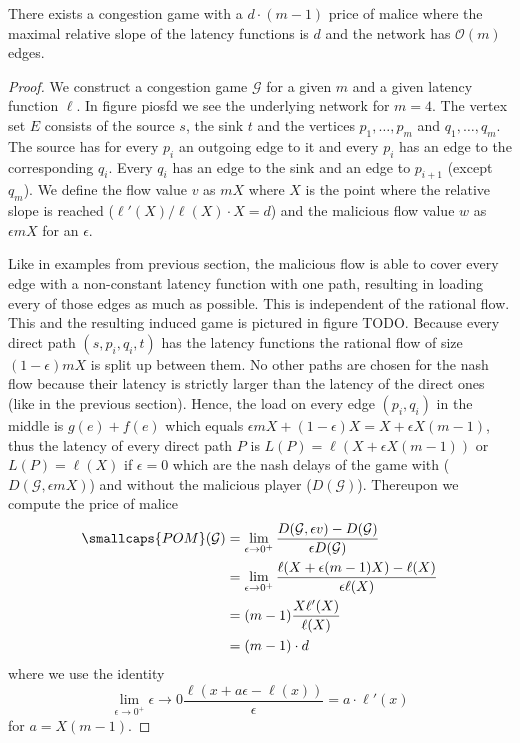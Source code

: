 \begin{theorem}
	There exists a congestion game with a $d \cdot (m - 1)$ price of malice where the maximal relative slope of the latency functions is $d$ and the network has $\mathcal O(m)$ edges.
\end{theorem}
\begin{proof}
	We construct a congestion game $\mathcal G$ for a given $m$ and a given latency function $\ell$.
	In figure piosfd we see the underlying network for $m=4$.
	The vertex set $E$ consists of the source $s$, the sink $t$ and the vertices $p_1, \dots, p_m$ and $q_1, \dots, q_m$.
	The source has for every $p_i$ an outgoing edge to it and every $p_i$ has an edge to the corresponding $q_i$.
	Every $q_i$ has an edge to the sink and an edge to $p_{i+1}$ (except $q_m$).
	We define the flow value $v$ as $mX$ where $X$ is the point where the relative slope is reached ($\ell'(X)/\ell(X) \cdot X = d$) and the malicious flow value $w$ as $\epsilon m X$ for an $\epsilon$.
	
	Like in examples from previous section, the malicious flow is able to cover every edge with a non-constant latency function with one path, resulting in loading every of those edges as much as possible.
	This  is independent of the rational flow.
	This and the resulting induced game is pictured in figure TODO.
	Because every direct path $(s, p_i, q_i, t)$ has the latency functions the rational flow of size $(1-\epsilon)mX$ is split up between them. 
	No other paths are chosen for the nash flow because their latency is strictly larger than the latency of the direct ones (like in the previous section).
	Hence, the load on every edge $(p_i, q_i)$ in the middle is $g(e) + f(e)$ which equals $\epsilon m X + (1-\epsilon)X = X+ \epsilon X (m-1)$, thus the latency of every direct path $P$ is $L(P) = \ell(X + \epsilon X (m-1))$ or $L(P)=\ell(X)$ if $\epsilon = 0$ which are the nash delays of the game with ($D(\mathcal G, \epsilon m X)$) and without the malicious player ($D(\mathcal G)$).
	Thereupon we compute the price of malice
	\begin{align*}
		\smallcaps{POM}(\mathcal G) &= \lim_{\epsilon \to 0^+} \dfrac{D(\mathcal G, \epsilon v) - D(\mathcal G)}{\epsilon D(\mathcal G)} \\
		&= \lim_{\epsilon \to 0^+} \dfrac{\ell (X + \epsilon (m-1) X) - \ell(X)}{\epsilon \ell(X)} \\
		&= (m - 1)\dfrac{X \ell'(X)}{\ell(X)} \\
		&= (m - 1) \cdot d
	\end{align*}
	where we use the identity 
	\[ \lim_{\epsilon \to 0^+}\epsilon \to 0 \frac{\ell(x+a\epsilon - \ell(x))}{\epsilon} = a \cdot  \ell'(x) \]
	for $a=X(m-1)$.
\end{proof}

